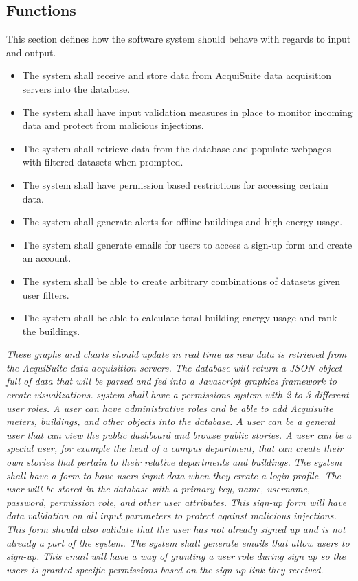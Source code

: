 \documentclass[onecolumn, draftclsnofoot,10pt, compsoc]{IEEEtran}
\begin{document}
    
    \subsection{Functions}
    This section defines how the software system should behave with regards to input and output.
    \begin{itemize}
    \item The system shall receive and store data from AcquiSuite data acquisition servers into the database. 
    \item The system shall have input validation measures in place to monitor incoming data and protect from malicious injections.
    \item The system shall retrieve data from the database and populate webpages with filtered datasets when prompted.
    \item The system shall have permission based restrictions for accessing certain data.
    \item The system shall generate alerts for offline buildings and high energy usage.
    \item The system shall generate emails for users to access a sign-up form and create an account.
    \item The system shall be able to create arbitrary combinations of datasets given user filters.
    \item The system shall be able to calculate total building energy usage and rank the buildings.
    \end{itemize}
    \textit{These graphs and charts should update in real time as new data is retrieved from the AcquiSuite data acquisition servers. The database will return a JSON object full of data that will be parsed and fed into a Javascript graphics framework to create visualizations.}
    \textit{system shall have a permissions system with 2 to 3 different user roles. A user can have administrative roles and be able to add Acquisuite meters, buildings, and other objects into the database. A user can be a general user that can view the public dashboard and browse public stories. A user can be a special user, for example the head of a campus department, that can create their own stories that pertain to their relative departments and buildings. 
    The system shall have a form to have users input data when they create a login profile. The user will be stored in the database with a primary key, name, username, password, permission role, and other user attributes. This sign-up form will have data validation on all input parameters to protect against malicious injections. This form should also validate that the user has not already signed up and is not already a part of the system.
    The system shall generate emails that allow users to sign-up. This email will have a way of granting a user role during sign up so the users is granted specific permissions based on the sign-up link they received. }
\end{document}
